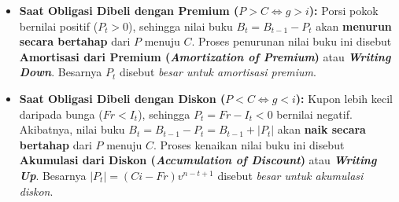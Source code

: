 \documentclass[11pt,a4paper]{article}
\begin{document}
\begin{itemize}
    \item \textbf{Saat Obligasi Dibeli dengan Premium ($P > C \iff g > i$):}
    Porsi pokok bernilai positif ($P_t > 0$), sehingga nilai buku $B_t = B_{t-1} - P_t$ akan \textbf{menurun secara bertahap} dari $P$ menuju $C$. Proses penurunan nilai buku ini disebut \textbf{Amortisasi dari Premium (\textit{Amortization of Premium})} atau \textbf{\textit{Writing Down}}. Besarnya $P_t$ disebut \textit{besar untuk amortisasi premium}.
    \item \textbf{Saat Obligasi Dibeli dengan Diskon ($P < C \iff g < i$):}
    Kupon lebih kecil daripada bunga ($Fr < I_t$), sehingga $P_t = Fr - I_t < 0$ bernilai negatif. Akibatnya, nilai buku $B_t = B_{t-1} - P_t = B_{t-1} + |P_t|$ akan \textbf{naik secara bertahap} dari $P$ menuju $C$. Proses kenaikan nilai buku ini disebut \textbf{Akumulasi dari Diskon (\textit{Accumulation of Discount})} atau \textbf{\textit{Writing Up}}. Besarnya $|P_t| = (Ci - Fr)v^{n-t+1}$ disebut \textit{besar untuk akumulasi diskon}.
\end{itemize}

\begin{center}
\end{center}
\end{document}
